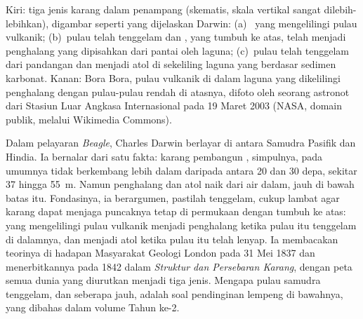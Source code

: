 \begin{omfigure}
{\small Kiri: tiga jenis  karang dalam penampang (skematis, skala vertikal sangat dilebih-lebihkan), digambar seperti yang dijelaskan Darwin: (a)~ yang mengelilingi pulau vulkanik; (b)~pulau telah tenggelam dan , yang tumbuh ke atas, telah menjadi  penghalang yang dipisahkan dari pantai oleh laguna; (c)~pulau telah tenggelam dari pandangan dan  menjadi atol di sekeliling laguna yang berdasar sedimen karbonat. Kanan: Bora Bora, pulau vulkanik di dalam laguna yang dikelilingi  penghalang dengan pulau-pulau rendah di atasnya, difoto oleh seorang astronot dari Stasiun Luar Angkasa Internasional pada 19 Maret 2003 (NASA, domain publik, melalui Wikimedia Commons).}
\label{fig:b1:chemical-biogenic-sediments:reefs}
\end{omfigure}

\begin{history}
Dalam pelayaran \emph{Beagle}, Charles Darwin berlayar di antara  Samudra Pasifik dan Hindia. Ia bernalar dari satu fakta: karang pembangun , simpulnya, pada umumnya tidak berkembang lebih dalam daripada antara 20 dan 30 depa, sekitar 37 hingga \qty{55}{m}. Namun  penghalang dan atol naik dari air dalam, jauh di bawah batas itu. Fondasinya, ia berargumen, pastilah tenggelam, cukup lambat agar karang dapat menjaga puncaknya tetap di permukaan dengan tumbuh ke atas:  yang mengelilingi pulau vulkanik menjadi  penghalang ketika pulau itu tenggelam di dalamnya, dan menjadi atol ketika pulau itu telah lenyap. Ia membacakan teorinya di hadapan Masyarakat Geologi London pada 31 Mei 1837 dan menerbitkannya pada 1842 dalam \emph{Struktur dan Persebaran  Karang}, dengan peta semua  dunia yang diurutkan menjadi tiga jenis. Mengapa pulau samudra tenggelam, dan seberapa jauh, adalah soal pendinginan lempeng di bawahnya, yang dibahas dalam volume Tahun ke-2.
\end{history}

